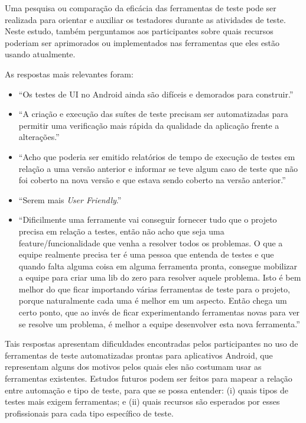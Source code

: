 \begin{itemize}
Uma pesquisa ou comparação da eficácia das ferramentas de teste pode ser realizada para orientar e auxiliar os testadores durante as atividades de teste. Neste estudo, também perguntamos aos participantes sobre quais recursos poderiam ser aprimorados ou implementados nas ferramentas que eles estão usando atualmente.

As respostas mais relevantes foram:

\begin{itemize}
    \item ``Os testes de UI no Android ainda são difíceis e demorados para construir.''
    \item ``A criação e execução das suítes de teste precisam ser automatizadas para permitir uma verificação mais rápida da qualidade da aplicação frente a alterações.''
    \item ``Acho que poderia ser emitido relatórios de tempo de execução de testes em relação a uma versão anterior e informar se teve algum caso de teste que não foi coberto na nova versão e que estava sendo coberto na versão anterior.''
    \item ``Serem mais \textit{User Friendly}.''
    \item ``Dificilmente uma ferramente vai conseguir fornecer tudo que o projeto precisa em relação a testes, então não acho que seja uma feature/funcionalidade que venha a resolver todos os problemas. O que a equipe realmente precisa ter é uma pessoa que entenda de testes e que quando falta alguma coisa em alguma ferramenta pronta, consegue mobilizar a equipe para criar uma lib do zero para resolver aquele problema. Isto é bem melhor do que ficar importando várias ferramentas de teste para o projeto, porque naturalmente cada uma é melhor em um aspecto. Então chega um certo ponto, que ao invés de ficar experimentando ferramentas novas para ver se resolve um problema, é melhor a equipe desenvolver esta nova ferramenta.''
    
\end{itemize}

Tais respostas apresentam dificuldades encontradas pelos participantes no uso de ferramentas de teste automatizadas prontas para aplicativos Android, que representam alguns dos motivos pelos quais eles não costumam usar as ferramentas existentes. Estudos futuros podem ser feitos para mapear a relação entre automação e tipo de teste, para que se possa entender: (i) quais tipos de testes mais exigem ferramentas; e (ii) quais recursos são esperados por esses profissionais para cada tipo específico de teste.
    

\end{itemize}
